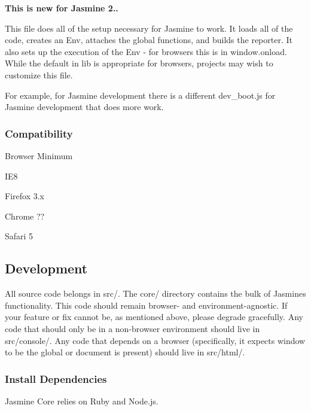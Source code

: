{\bfseries This is new for Jasmine 2..}

This file does all of the setup necessary for Jasmine to work. It loads all of the code, creates an {\ttfamily Env}, attaches the global functions, and builds the reporter. It also sets up the execution of the {\ttfamily Env} -\/ for browsers this is in {\ttfamily window.\+onload}. While the default in {\ttfamily lib} is appropriate for browsers, projects may wish to customize this file.

For example, for Jasmine development there is a different {\ttfamily dev\+\_\+boot.\+js} for Jasmine development that does more work.

\subsubsection*{Compatibility}


\begin{DoxyItemize}
\item Browser Minimum
\begin{DoxyItemize}
\item I\+E8
\item Firefox 3.\+x
\item Chrome ??
\item Safari 5
\end{DoxyItemize}
\end{DoxyItemize}

\subsection*{Development}

All source code belongs in {\ttfamily src/}. The {\ttfamily core/} directory contains the bulk of Jasmine\textquotesingle{}s functionality. This code should remain browser-\/ and environment-\/agnostic. If your feature or fix cannot be, as mentioned above, please degrade gracefully. Any code that should only be in a non-\/browser environment should live in {\ttfamily src/console/}. Any code that depends on a browser (specifically, it expects {\ttfamily window} to be the global or {\ttfamily document} is present) should live in {\ttfamily src/html/}.

\subsubsection*{Install Dependencies}

Jasmine Core relies on Ruby and Node.\+js.

